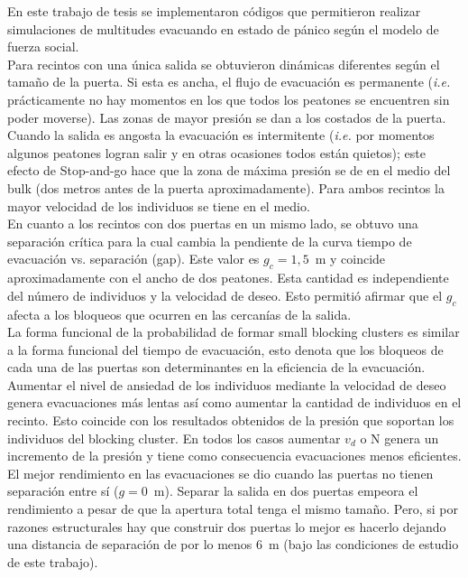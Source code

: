 En este trabajo de tesis se implementaron códigos que permitieron realizar simulaciones de multitudes evacuando en estado de pánico según el modelo de fuerza social. \\

Para recintos con una única salida se obtuvieron dinámicas diferentes según el tamaño de la puerta. Si esta es ancha, el flujo de evacuación es permanente (\emph{i.e.} prácticamente no hay momentos en los que todos los peatones se encuentren sin poder moverse). Las zonas de mayor presión se dan a los costados de la puerta. Cuando la salida es angosta la evacuación es intermitente (\emph{i.e.} por momentos algunos peatones logran salir y en otras ocasiones todos están quietos); este efecto de Stop-and-go hace que la zona de máxima presión se de en el medio del bulk (dos metros antes de la puerta aproximadamente). 
Para ambos recintos la mayor velocidad de los individuos se tiene en el medio. \\

En cuanto a los recintos con dos puertas en un mismo lado, se obtuvo  una separación crítica para la cual cambia la pendiente de la curva tiempo de evacuación vs. separación (gap). Este valor es $g_c=1,5$~m y coincide aproximadamente con el ancho de dos peatones. Esta cantidad es independiente del número de individuos y la velocidad de deseo. Esto permitió afirmar que el $g_c$ afecta a los bloqueos que ocurren en las cercanías de la salida. \\

La forma funcional de la probabilidad de formar small blocking clusters es similar a la forma funcional del tiempo de evacuación, esto denota que los bloqueos de cada una de las puertas son determinantes en la eficiencia de la evacuación. \\

Aumentar el nivel de ansiedad de los individuos mediante la velocidad de deseo genera evacuaciones más lentas así como aumentar la cantidad de individuos en el recinto. Esto coincide con los resultados obtenidos de la presión que soportan los individuos del blocking cluster. En todos los casos aumentar $v_d$ o N genera un incremento de la presión y tiene como consecuencia evacuaciones menos eficientes.\\

El mejor rendimiento en las evacuaciones se dio cuando las puertas no tienen separación entre sí ($g=0$~m). Separar la salida en dos puertas empeora el rendimiento a pesar de que la apertura total tenga el mismo tamaño. Pero, si por razones estructurales hay que construir dos puertas lo mejor es hacerlo dejando una distancia de separación de por lo menos 6~m (bajo las condiciones de estudio de este trabajo).    
